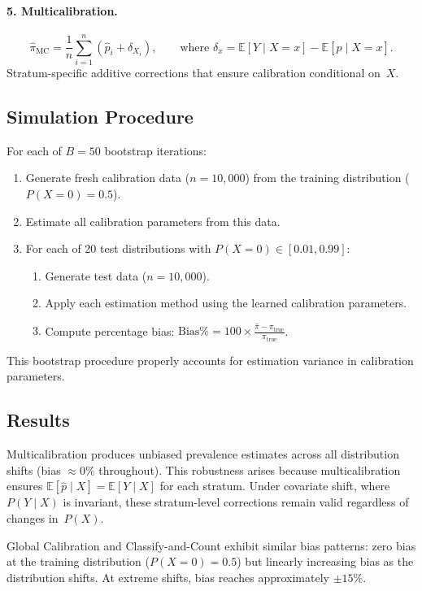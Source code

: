 \documentclass[12pt]{article}
\begin{document}
\paragraph{5. Multicalibration.}
\[
  \hat{\pi}_{\text{MC}} = \frac{1}{n}\sum_{i=1}^{n}
    (\hat{p}_i + \delta_{X_i}), \qquad \text{where }
  \delta_x = \mathbb{E}[Y \mid X=x] - \mathbb{E}[\hat{p} \mid X=x].
\]
Stratum-specific additive corrections that ensure calibration conditional
on~$X$.

\subsection{Simulation Procedure}

For each of $B=50$ bootstrap iterations:
\begin{enumerate}
  \item Generate fresh calibration data ($n=10{,}000$) from the training
    distribution ($P(X=0)=0.5$).
  \item Estimate all calibration parameters from this data.
  \item For each of 20 test distributions with
    $P(X=0) \in [0.01, 0.99]$:
    \begin{enumerate}
      \item Generate test data ($n=10{,}000$).
      \item Apply each estimation method using the learned calibration
        parameters.
      \item Compute percentage bias:
        $\text{Bias}\% = 100 \times
          \frac{\hat{\pi} - \pi_{\text{true}}}{\pi_{\text{true}}}$.
    \end{enumerate}
\end{enumerate}
This bootstrap procedure properly accounts for estimation variance in
calibration parameters.

\subsection{Results}

Multicalibration produces unbiased prevalence estimates across all
distribution shifts (bias $\approx 0\%$ throughout). This robustness
arises because multicalibration ensures
$\mathbb{E}[\hat{p} \mid X] = \mathbb{E}[Y \mid X]$ for each stratum.
Under covariate shift, where $P(Y \mid X)$ is invariant, these
stratum-level corrections remain valid regardless of changes in~$P(X)$.

Global Calibration and Classify-and-Count exhibit similar bias patterns:
zero bias at the training distribution ($P(X=0)=0.5$) but linearly
increasing bias as the distribution shifts. At extreme shifts, bias
reaches approximately $\pm 15\%$.
\end{document}
